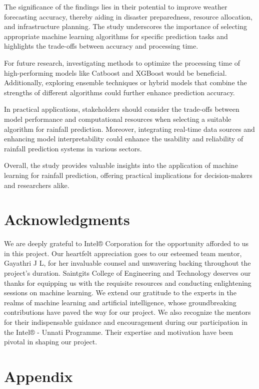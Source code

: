 \documentclass{josis}
\begin{document}
The significance of the findings lies in their potential to improve weather forecasting accuracy, thereby aiding in disaster preparedness, resource allocation, and infrastructure planning. The study underscores the importance of selecting appropriate machine learning algorithms for specific prediction tasks and highlights the trade-offs between accuracy and processing time.

For future research, investigating methods to optimize the processing time of high-performing models like Catboost and XGBoost would be beneficial. Additionally, exploring ensemble techniques or hybrid models that combine the strengths of different algorithms could further enhance prediction accuracy.

In practical applications, stakeholders should consider the trade-offs between model performance and computational resources when selecting a suitable algorithm for rainfall prediction. Moreover, integrating real-time data sources and enhancing model interpretability could enhance the usability and reliability of rainfall prediction systems in various sectors.

Overall, the study provides valuable insights into the application of machine learning for rainfall prediction, offering practical implications for decision-makers and researchers alike.

\section*{Acknowledgments}
We are deeply grateful to Intel® Corporation for the opportunity afforded to us in this project. Our heartfelt appreciation goes to our esteemed team mentor, Gayathri J L, for her invaluable counsel and unwavering backing throughout the project's duration. Saintgits College of Engineering and Technology deserves our thanks for equipping us with the requisite resources and conducting enlightening sessions on machine learning. We extend our gratitude to the experts in the realms of machine learning and artificial intelligence, whose groundbreaking contributions have paved the way for our project. We also recognize the mentors for their indispensable guidance and encouragement during our participation in the Intel® - Unnati Programme. Their expertise and motivation have been pivotal in shaping our project.

\cite{*}


\appendix


\section{Appendix}
\end{document}
